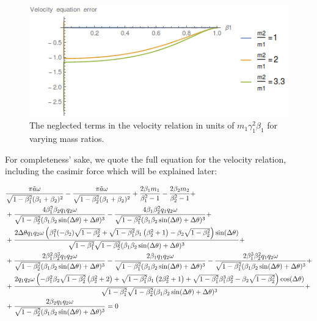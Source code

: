 \documentclass[11pt,a4paper]{article}
\begin{document}
\begin{figure}[h]
\centering
\includegraphics[scale=0.7]{figures/VerifyEMApproxVelocity.png}
\caption{The neglected terms in the velocity relation in units of $m_1\gamma_1^2\beta_1$ for varying mass ratios.}
\label{fig:EMApproxVerifyVelocity}
\end{figure}

For completeness' sake, we quote the full equation for the velocity relation, including the casimir force which will be explained later:

\begin{align}
&\frac{\pi  \tilde{a} \omega }{\sqrt{1-\beta_1^2} (\beta_1+\beta_2)^2}-\frac{\pi  \tilde{a} \omega }{\sqrt{1-\beta_2^2} (\beta_1+\beta_2)^2}+\frac{2 \beta_1 m_1}{\beta_1^2-1}-\frac{2 \beta_2 m_2}{\beta_2^2-1}+ \notag \\
&+\frac{4 \beta_1^2 \beta_2 q_1 q_2 \omega }{\sqrt{1-\beta_2^2} (\beta_1 \beta_2 \sin (\Delta \theta )+\Delta \theta )^3}-\frac{4 \beta_1 \beta_2^2 q_1 q_2 \omega }{\sqrt{1-\beta_1^2} (\beta_1 \beta_2 \sin (\Delta \theta )+\Delta \theta )^3}+\notag \\
&+\frac{2 \Delta \theta  q_1 q_2 \omega  \left(\beta_1^2 (-\beta_2) \sqrt{1-\beta_2^2}+\sqrt{1-\beta_1^2} \beta_1 \left(\beta_2^2+1\right)-\beta_2 \sqrt{1-\beta_2^2}\right) \sin (\Delta \theta )}{\sqrt{1-\beta_1^2} \sqrt{1-\beta_2^2} (\beta_1 \beta_2 \sin (\Delta \theta )+\Delta \theta )^3}+\notag \\
&+\frac{2 \beta_1^2 \beta_2^3 q_1 q_2 \omega }{\sqrt{1-\beta_2^2} (\beta_1 \beta_2 \sin (\Delta \theta )+\Delta \theta )^3}-\frac{2 \beta_1 q_1 q_2 \omega }{\sqrt{1-\beta_1^2} (\beta_1 \beta_2 \sin (\Delta \theta )+\Delta \theta )^3}-\frac{2 \beta_1^3 \beta_2^2 q_1 q_2 \omega }{\sqrt{1-\beta_1^2} (\beta_1 \beta_2 \sin (\Delta \theta )+\Delta \theta )^3}+\notag \\
&+\frac{2 q_1 q_2 \omega  \left(-\beta_1^2 \beta_2 \sqrt{1-\beta_2^2} \left(\beta_2^2+2\right)+\sqrt{1-\beta_1^2} \beta_1 \left(2 \beta_2^2+1\right)+\sqrt{1-\beta_1^2} \beta_1^3 \beta_2^2-\beta_2 \sqrt{1-\beta_2^2}\right) \cos (\Delta \theta )}{\sqrt{1-\beta_1^2} \sqrt{1-\beta_2^2} (\beta_1 \beta_2 \sin (\Delta \theta )+\Delta \theta )^3}+\notag \\
&+\frac{2 \beta_2 q_1 q_2 \omega }{\sqrt{1-\beta_2^2} (\beta_1 \beta_2 \sin (\Delta \theta )+\Delta \theta )^3}=0
\end{align}
\end{document}
